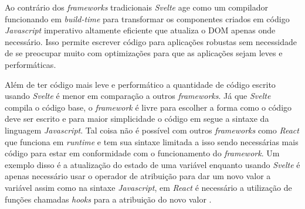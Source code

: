 Ao contrário dos \textit{frameworks} tradicionais \textit{Svelte} age como um compilador funcionando em \textit{build-time} para transformar os componentes criados em código \textit{Javascript} imperativo altamente eficiente que atualiza o DOM apenas onde necessário. Isso permite escrever código para aplicações robustas sem necessidade de se preocupar muito com optimizações para que as aplicações sejam leves e performáticas.

Além de ter código mais leve e performático a quantidade de código escrito usando \textit{Svelte} é menor em comparação a outros \textit{frameworks}. Já que \textit{Svelte} compila o código base, o \textit{framework} é livre para escolher a forma como o código deve ser escrito e para maior simplicidade o código em  segue a sintaxe da linguagem \textit{Javascript}. Tal coisa não é possível com outros \textit{frameworks} como \textit{React} que funciona em \textit{runtime} e tem sua sintaxe limitada a isso sendo necessárias mais código para estar em conformidade com o funcionamento do \textit{framework}. Um exemplo disso é a atualização do estado de uma variável enquanto usando \textit{Svelte} é apenas necessário usar o operador de atribuição para dar um novo valor a variável assim como na sintaxe \textit{Javascript}, em \textit{React} é necessário a utilização de funções chamadas \textit{hooks} para a atribuição do novo valor \cite{harris_write_2019}.